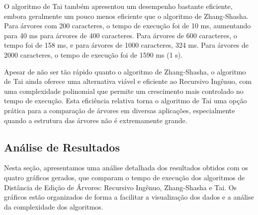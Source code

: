 \documentclass[12pt]{article}
\begin{document}
O algoritmo de Tai também apresentou um desempenho bastante eficiente, embora geralmente um pouco menos eficiente que o algoritmo de Zhang-Shasha. Para árvores com 200 caracteres, o tempo de execução foi de 10 ms, aumentando para 40 ms para árvores de 400 caracteres. Para árvores de 600 caracteres, o tempo foi de 158 ms, e para árvores de 1000 caracteres, 324 ms. Para árvores de 2000 caracteres, o tempo de execução foi de 1590 ms (1 s).

Apesar de não ser tão rápido quanto o algoritmo de Zhang-Shasha, o algoritmo de Tai ainda oferece uma alternativa viável e eficiente ao Recursivo Ingênuo, com uma complexidade polinomial que permite um crescimento mais controlado no tempo de execução. Esta eficiência relativa torna o algoritmo de Tai uma opção prática para a comparação de árvores em diversas aplicações, especialmente quando a estrutura das árvores não é extremamente grande.

\subsection{Análise de Resultados}

Nesta seção, apresentamos uma análise detalhada dos resultados obtidos com os quatro gráficos gerados, que comparam o tempo de execução dos algoritmos de Distância de Edição de Árvores: Recursivo Ingênuo, Zhang-Shasha e Tai. Os gráficos estão organizados de forma a facilitar a visualização dos dados e a análise da complexidade dos algoritmos.
\end{document}
